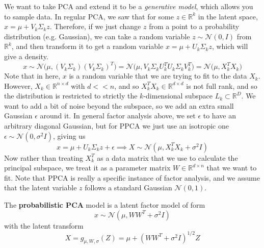   We want to take PCA and extend it to be a \textit{generative model}, which allows you to sample data. In regular PCA, we saw that for some $z \in \mathbb{R}^k$ in the latent space, $\hat{x} = \mu + V_k \Sigma_k z$. Therefore, if we just change $z$ from a point to a probability distribution (e.g. Gaussian), we can take a random variable $z \sim \mathcal{N}(0, I)$ from $\mathbb{R}^k$, and then transform it to get a random variable $x = \mu + U_k \Sigma_k z$, which will give a density. 
  \begin{equation}
    x \sim \mathcal{N} \big( \mu, (V_k \Sigma_k)(V_k \Sigma_k)^T \big) = \mathcal{N} \big( \mu, V_k \Sigma_k U_k^T U_k \Sigma_k V_k^T \big) = \mathcal{N} \big( \mu, X_k^T X_k)
  \end{equation} 
  Note that in here, $x$ is a random variable that we are trying to fit to the data $X_k$. However, $X_k \in \mathbb{R}^{n \times d}$ with $d << n$, and so $X_k^T X_k \in \mathbb{R}^{d \times d}$ is not full rank, and so the distribution is restricted to strictly the $k$-dimensional subspace $L_k \subset \mathbb{R}^D$. We want to add a bit of noise beyond the subspace, so we add an extra small Gaussian $\epsilon$ around it. In general factor analysis above, we set $\epsilon$ to have an arbitrary diagonal Gaussian, but for PPCA we just use an isotropic one $\epsilon \sim \mathcal{N}(0, \sigma^2 I)$, giving us  
  \begin{equation}
    x = \mu + U_k \Sigma_k z + \epsilon \implies X \sim \mathcal{N}(\mu, X_k^T X_k + \sigma^2 I)
  \end{equation} 
  Now rather than treating $X_k^T$ as a data matrix that we use to calculate the principal subspace, we treat it as a parameter matrix $W \in \mathbb{R}^{d \times n}$ that we want to fit. Note that PPCA is really a specific instance of factor analysis, and we assume that the latent variable $z$ follows a standard Gaussian $\mathcal{N}(0, 1)$. 

  \begin{definition} 
    The \textbf{probabilistic PCA} model is a latent factor model of form  
    \begin{equation}
      x \sim \mathcal{N}(\mu, W W^T + \sigma^2 I) 
    \end{equation} 
    with the latent transform 
    \begin{equation}
      X = g_{\mu, W, \sigma} (Z) = \mu + (WW^T + \sigma^2 I )^{1/2} Z
    \end{equation}
  \end{definition} 

